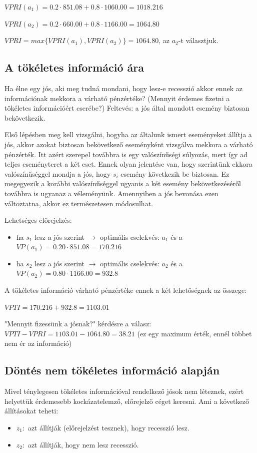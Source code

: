\documentclass[a4paper,12pt]{article}
\begin{document}
$VPRI(a_1) = 0.2\cdot 851.08 + 0.8\cdot 1060.00 = 1018.216$

$VPRI(a_2) = 0.2\cdot 660.00 + 0.8\cdot 1166.00 = 1064.80$

$VPRI = max\{VPRI(a_1), VPRI(a_2)\} = 1064.80$, az $a_2$-t választjuk.

\subsection{A tökéletes információ ára}
Ha élne egy jós, aki meg tudná mondani, hogy lesz-e recesszió
akkor ennek az információnak mekkora a várható pénzértéke?
(Mennyit érdemes fizetni a tökéletes információért cserébe?)
Feltevés: a jós által mondott esemény biztosan bekövetkezik.

Első lépésben meg kell vizsgálni, hogyha az általunk ismert eseményeket állítja a jós,
akkor azokat biztosan bekövetkező eseményként vizsgálva mekkora a várható pénzérték.
Itt azért szerepel továbbra is egy valószínűségi súlyozás, mert így ad teljes eseményteret a két eset.
Ennek olyan jelentése van, hogy szerintünk ekkora valószínűséggel mondja a jós, hogy $s_{i}$ esemény következik be biztosan.
Ez megegyezik a korábbi valószínűséggel ugyanis a két esemény bekövetkezéséről továbbra is ugyanaz a véleményünk.
Amennyiben a jós bevonása ezen változtatna, akkor ez természetesen módosulhat.

Lehetséges előrejelzés:
\begin{itemize}
\item ha $s_{1}$ lesz a jós szerint $\rightarrow$ optimális cselekvés: $a_1$  és a $VP(a_1) = 0.20\cdot 851.08 = 170.216$
\item ha $s_{2}$ lesz a jós szerint $\rightarrow$ optimális cselekvés: $a_2$  és a $VP(a_2) = 0.80\cdot 1166.00 = 932.8$
\end{itemize}

A tökéletes információ várható pénzértéke ennek a két lehetőségnek az összege: 

$VPTI = 170.216 + 932.8 = 1103.01$

"Mennyit fizessünk a jósnak?" kérdésre a válasz: $VPTI - VPRI = 1103.01 - 1064.80 = 38.21$ (ez egy maximum érték, ennél többet nem ér az információ)

\subsection{Döntés nem tökéletes információ alapján}
\label{sec:NTI}

Mivel ténylegesen tökéletes információval rendelkező jósok nem léteznek,
ezért helyettük érdemesebb kockázatelemző, előrejelző céget keresni.
Ami a következő állításokat teheti:
\begin{itemize}
\item $z_{1}:$ azt állítják (előrejelzést tesznek), hogy recesszió lesz.
\item $z_{2}:$ azt állítják, hogy nem lesz recesszió. %
\end{itemize}
\end{document}
